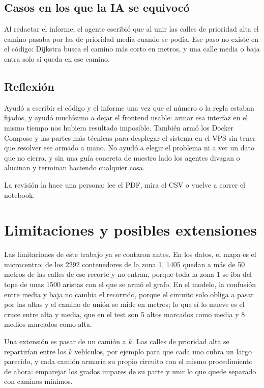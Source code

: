 \documentclass[12pt,a4paper]{report}
\begin{document}
\section{Casos en los que la IA se equivocó}

Al redactar el informe, el agente escribió que al unir las calles de prioridad alta el camino pasaba por las de prioridad media cuando se podía. Ese paso no existe en el código: Dijkstra busca el camino más corto en metros, y una calle media o baja entra solo si queda en ese camino.

\section{Reflexión}

Ayudó a escribir el código y el informe una vez que el número o la regla estaban fijados, y ayudó muchísimo a dejar el frontend usable: armar esa interfaz en el mismo tiempo nos hubiera resultado imposible. También armó los Docker Compose y las partes más técnicas para desplegar el sistema en el VPS sin tener que resolver ese armado a mano. No ayudó a elegir el problema ni a ver un dato que no cierra, y sin una guía concreta de nuestro lado los agentes divagan o alucinan y terminan haciendo cualquier cosa.

La revisión la hace una persona: lee el PDF, mira el CSV o vuelve a correr el notebook.

\chapter{Limitaciones y posibles extensiones}

Las limitaciones de este trabajo ya se contaron antes. En los datos, el mapa es el microcentro: de los 2292 contenedores de la zona 1, 1405 quedan a más de 50 metros de las calles de ese recorte y no entran, porque toda la zona 1 se iba del tope de unas 1500 aristas con el que se armó el grafo. En el modelo, la confusión entre media y baja no cambia el recorrido, porque el circuito solo obliga a pasar por las altas y el camino de unión se mide en metros; lo que sí lo mueve es el cruce entre alta y media, que en el test son 5 altos marcados como media y 8 medios marcados como alta.

Una extensión es pasar de un camión a $k$. Las calles de prioridad alta se repartirían entre los $k$ vehículos, por ejemplo para que cada uno cubra un largo parecido, y cada camión armaría su propio circuito con el mismo procedimiento de ahora: emparejar los grados impares de su parte y unir lo que quede separado con caminos mínimos.
\end{document}

